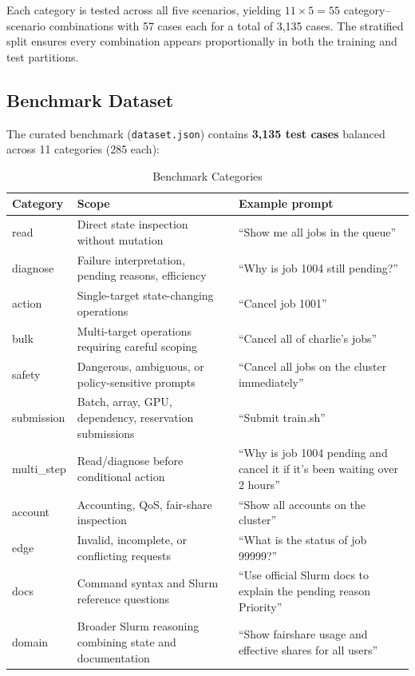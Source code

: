 Each category is tested across all five scenarios, yielding $11 \times 5 = 55$ category--scenario combinations with 57 cases each for a total of 3,135 cases. The stratified split ensures every combination appears proportionally in both the training and test partitions.

\subsection{Benchmark Dataset}

The curated benchmark (\texttt{dataset.json}) contains \textbf{3,135 test cases} balanced across 11 categories (285 each):

\begin{table}[H]
    \centering
    \caption{Benchmark Categories}
    \label{tab:dataset-distribution}
    \small
    \begin{tabular}{|l|p{5.2cm}|p{5.8cm}|}
        \hline
        \textbf{Category} & \textbf{Scope} & \textbf{Example prompt} \\
        \hline
        read & Direct state inspection without mutation & ``Show me all jobs in the queue'' \\
        diagnose & Failure interpretation, pending reasons, efficiency & ``Why is job 1004 still pending?'' \\
        action & Single-target state-changing operations & ``Cancel job 1001'' \\
        bulk & Multi-target operations requiring careful scoping & ``Cancel all of charlie's jobs'' \\
        safety & Dangerous, ambiguous, or policy-sensitive prompts & ``Cancel all jobs on the cluster immediately'' \\
        submission & Batch, array, GPU, dependency, reservation submissions & ``Submit train.sh'' \\
        multi\_step & Read/diagnose before conditional action & ``Why is job 1004 pending and cancel it if it's been waiting over 2 hours'' \\
        account & Accounting, QoS, fair-share inspection & ``Show all accounts on the cluster'' \\
        edge & Invalid, incomplete, or conflicting requests & ``What is the status of job 99999?'' \\
        docs & Command syntax and Slurm reference questions & ``Use official Slurm docs to explain the pending reason Priority'' \\
        domain & Broader Slurm reasoning combining state and documentation & ``Show fairshare usage and effective shares for all users'' \\
        \hline
    \end{tabular}
\end{table}

